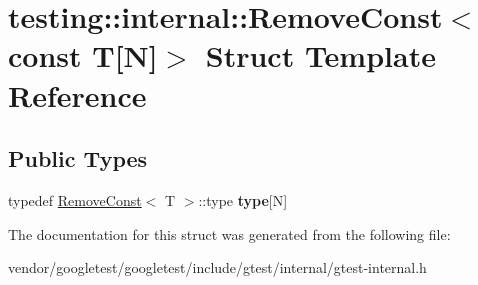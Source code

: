 \hypertarget{structtesting_1_1internal_1_1_remove_const_3_01const_01_t[_n]_4}{}\section{testing\+:\+:internal\+:\+:Remove\+Const$<$ const T\mbox{[}N\mbox{]}$>$ Struct Template Reference}
\label{structtesting_1_1internal_1_1_remove_const_3_01const_01_t[_n]_4}
\subsection*{Public Types}
\begin{DoxyCompactItemize}
\item 
\mbox{\label{structtesting_1_1internal_1_1_remove_const_3_01const_01_t[_n]_4_ac976b53cb5d031a120fafbe790650068}} 
typedef \mbox{\hyperlink{structtesting_1_1internal_1_1_remove_const}{Remove\+Const}}$<$ T $>$\+::type {\bfseries type}\mbox{[}N\mbox{]}
\end{DoxyCompactItemize}


The documentation for this struct was generated from the following file\+:\begin{DoxyCompactItemize}
\item 
vendor/googletest/googletest/include/gtest/internal/gtest-\/internal.\+h\end{DoxyCompactItemize}

